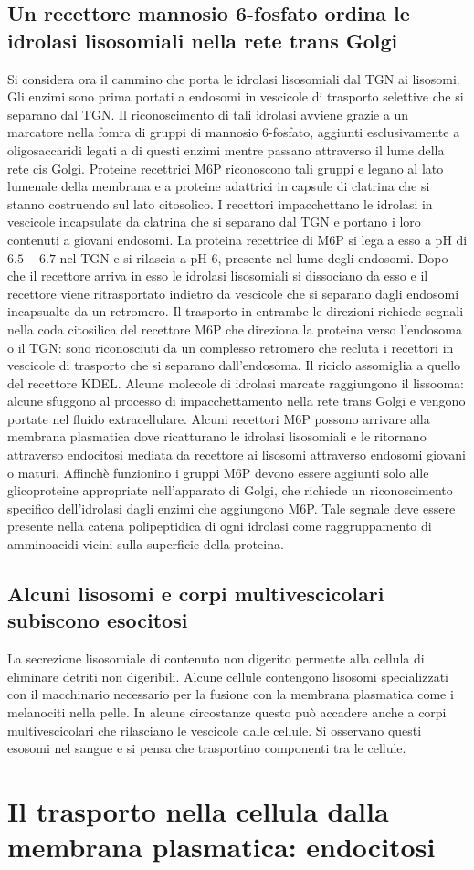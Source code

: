 \subsection{Un recettore mannosio $\mathbf{6}$-fosfato ordina le idrolasi lisosomiali nella rete trans Golgi}
Si considera ora il cammino che porta le idrolasi lisosomiali dal TGN ai lisosomi. Gli enzimi sono prima portati a endosomi in vescicole di trasporto selettive che si separano dal 
TGN. Il riconoscimento di tali idrolasi avviene grazie a un marcatore nella fomra di gruppi di mannosio $6$-fosfato, aggiunti esclusivamente a oligosaccaridi legati a  di questi
enzimi mentre passano attraverso il lume della rete cis Golgi. Proteine recettrici M6P riconoscono tali gruppi e legano al lato lumenale della membrana e a proteine adattrici in 
capsule di clatrina che si stanno costruendo sul lato citosolico. I recettori impacchettano le idrolasi in vescicole incapsulate da clatrina che si separano dal TGN e portano i loro
contenuti a giovani endosomi. La proteina recettrice di M6P si lega a esso a pH di $6.5-6.7$ nel TGN e si rilascia a pH $6$, presente nel lume degli endosomi. Dopo che il recettore
arriva in esso le idrolasi lisosomiali si dissociano da esso e il recettore viene ritrasportato indietro da vescicole che si separano dagli endosomi incapsualte da un retromero. 
Il trasporto in entrambe le direzioni richiede segnali nella coda citosilica del recettore M6P che direziona la proteina verso l'endosoma o il TGN: sono riconosciuti da un complesso 
retromero che recluta i recettori in vescicole di trasporto che si separano dall'endosoma. Il riciclo assomiglia a quello del recettore KDEL. Alcune molecole di idrolasi marcate 
raggiungono il lissooma: alcune sfuggono al processo di impacchettamento nella rete trans Golgi e vengono portate nel fluido extracellulare. Alcuni recettori M6P possono arrivare alla
membrana plasmatica dove ricatturano le idrolasi lisosomiali e le ritornano attraverso endocitosi mediata da recettore ai lisosomi attraverso endosomi giovani o maturi. Affinch\`e
funzionino i gruppi M6P devono essere aggiunti solo alle glicoproteine appropriate nell'apparato di Golgi, che richiede un riconoscimento specifico dell'idrolasi dagli enzimi che 
aggiungono M6P. Tale segnale deve essere presente nella catena polipeptidica di ogni idrolasi come raggruppamento di amminoacidi vicini sulla superficie della proteina. 
\subsection{Alcuni lisosomi e corpi multivescicolari subiscono esocitosi}
La secrezione lisosomiale di contenuto non digerito permette alla cellula di eliminare detriti non digeribili. Alcune cellule contengono lisosomi specializzati con il macchinario 
necessario per la fusione con la membrana plasmatica come i melanociti nella pelle. In alcune circostanze questo pu\`o accadere anche a corpi multivescicolari che rilasciano le
vescicole dalle cellule. Si osservano questi esosomi nel sangue e si pensa che trasportino componenti tra le cellule. 
\section{Il trasporto nella cellula dalla membrana plasmatica: endocitosi}
